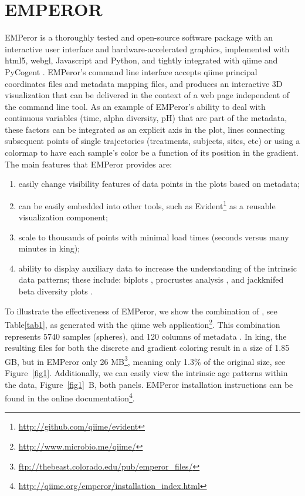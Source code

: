 \section{EMPEROR}
EMPeror is a thoroughly tested and open-source software package with an interactive user interface and hardware-accelerated graphics, implemented with \gls{html5}, \gls{webgl}, Javascript and Python, and tightly integrated with \gls{qiime} \cite{RN110} and PyCogent \cite{RN113}. EMPeror's command line interface accepts \gls{qiime} principal coordinates files and metadata mapping files, and produces an interactive 3D visualization that can be delivered in the context of a web page independent of the command line tool. As an example of EMPeror's ability to deal with continuous variables (time, alpha diversity, pH) that are part of the metadata, these factors can be integrated as an explicit axis in the plot, lines connecting subsequent points of single trajectories (treatments, subjects, sites, etc) or using a colormap to have each sample’s color be a function of its position in the gradient. The main features that EMPeror provides are: 
\begin{enumerate}
    \item easily change visibility features of data points in the plots based on metadata;
    \item can be easily embedded into other tools, such as Evident\footnote{\url{http://github.com/qiime/evident}} as a reusable visualization component;
    \item scale to thousands of points with minimal load times (seconds versus many minutes in \gls{king});
    \item ability to display auxiliary data to increase the understanding of the intrinsic data patterns; these include: biplots \cite{RN130}, procrustes analysis \cite{RN114}, and jackknifed beta diversity plots \cite{RN131}.
\end{enumerate}

To illustrate the effectiveness of EMPeror, we show the combination of \cite{RN85,RN129,RN35,RN11}, see Table\ref{tab1}, as generated with the \gls{qiime} web application\footnote{\url{http://www.microbio.me/qiime/}}. This combination represents 5740 samples (spheres), and 120 columns of metadata \cite{RN132}. In \gls{king}, the resulting files for both the discrete and gradient coloring result in a size of 1.85 GB, but in EMPeror only 26 MB\footnote{\url{ftp://thebeast.colorado.edu/pub/emperor_files/}}, meaning only 1.3\% of the original size, see Figure~\ref{fig1}. Additionally, we can easily view the intrinsic age patterns within the data, Figure~\ref{fig1}~B, both panels.
EMPeror installation instructions can be found in the online documentation\footnote{\url{http://qiime.org/emperor/installation_index.html}}.


